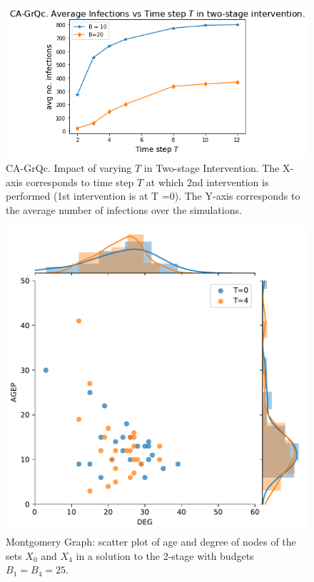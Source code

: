 \begin{figure}[!h]
    \centering
    \includegraphics[scale = 0.4]{figures/twostage.png}
    \caption{CA-GrQc. Impact of varying $T$ in Two-stage Intervention. The X-axis corresponds to time step $T$ at which 2nd intervention is performed (1st intervention is at T =0). The Y-axis corresponds to the average number of infections over the simulations.}
    \label{fig:temporal}
\end{figure}

\begin{figure}[!h]
    \centering
    \includegraphics[scale = 0.45]{figures/t0_t4_compare_age_deg.pdf}
    \caption{Montgomery Graph: scatter plot of age and degree of nodes of the sets $X_0$ and $X_4$ in a solution to the 2-stage \prob{} with budgets $B_1 = B_4 = 25$.}
    \label{fig:montagedeg}
\end{figure}

